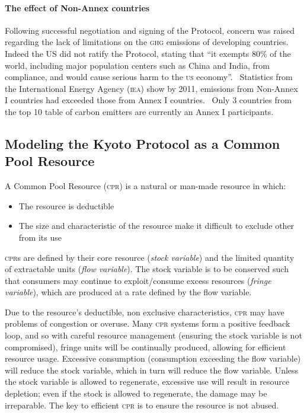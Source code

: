 \paragraph{The effect of Non-Annex countries}

Following successful negotiation and signing of the Protocol, concern was raised regarding the lack of limitations on the \textsc{ghg} emissions of developing countries. Indeed the \textsc{US} did not ratify the Protocol, stating that ``it exempts 80\% of the world, including major population centers such as China and India, from compliance, and would cause serious harm to the \textsc{us} economy''.~\cite{Hague-to-Marrakesh} Statistics from the International Energy Agency (\textsc{iea}) show by 2011, emissions from Non-Annex I countries had exceeded those from Annex I countries.~\cite{IEA-highlights} Only 3 countries from the top 10 table of carbon emitters are currently an Annex I participants.

\subsection{Modeling the Kyoto Protocol as a Common Pool Resource}

A Common Pool Resource (\textsc{cpr}) is a natural or man-made resource in which:~\cite{Ostrom-90}

\begin{itemize}
	\item The resource is deductible
	\item The size and characteristic of the resource make it difficult to exclude other from its use
\end{itemize}

\textsc{cpr}s are defined by their core resource (\emph{stock variable}) and the limited quantity of extractable units (\emph{flow variable}). The stock variable is to be conserved such that consumers may continue to exploit/consume excess resources (\emph{fringe variable}), which are produced at a rate defined by the flow variable.

Due to the resource's deductible, non exclusive characteristics, \textsc{cpr} may have problems of congestion or overuse. Many \textsc{cpr} systems form a positive feedback loop, and so with careful resource management (ensuring the stock variable is not compromised), fringe units will be continually produced, allowing for efficient resource usage. Excessive consumption (consumption exceeding the flow variable) will reduce the stock variable, which in turn will reduce the flow variable. Unless the stock variable is allowed to regenerate, excessive use will result in resource depletion; even if the stock is allowed to regenerate, the damage may be irreparable. The key to efficient \textsc{cpr} is to ensure the resource is not abused.

